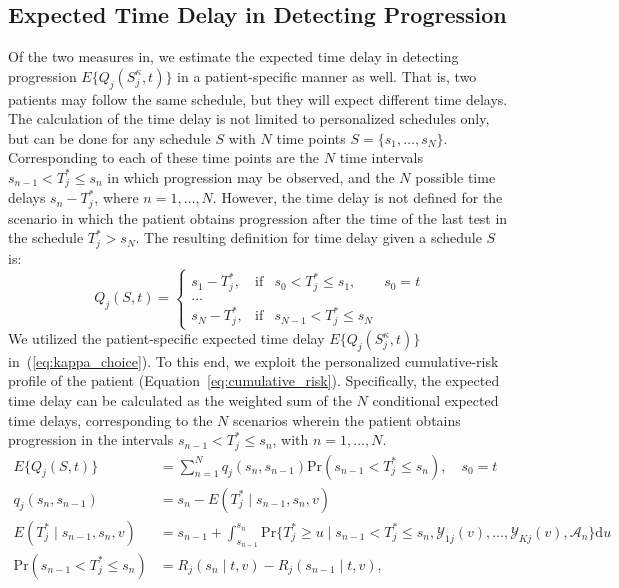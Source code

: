 \subsection{Expected Time Delay in Detecting Progression}
\label{subsec:exp_delay_estimation}
Of the two measures in, we estimate the expected time delay in detecting progression $E\{Q_j(S_j^{\kappa}, t)\}$ in a patient-specific manner as well. That is, two patients may follow the same schedule, but they will expect different time delays. The calculation of the time delay is not limited to personalized schedules only, but can be done for any schedule $S$ with $N$ time points $S=\{s_1,\ldots, s_N\}$. Corresponding to each of these time points are the $N$ time intervals $s_{n-1} < T^*_j \leq s_n$ in which progression may be observed, and the $N$ possible time delays $s_n - T^*_j$, where $n=1,\ldots,N$. However, the time delay is not defined for the scenario in which the patient obtains progression after the time of the last test in the schedule $T^*_j > s_N$. The resulting definition for time delay given a schedule $S$ is:
\begin{equation}
Q_j (S, t) = \left\{ \begin{array}{lcrr}
  s_1 - T^*_j, &\mbox{if}& s_0 < T^*_j \leq s_1, &s_0=t\\
  \ldots \\
  s_N - T^*_j, &\mbox{if}& s_{N-1} < T^*_j \leq s_N  
\end{array} \right.
\end{equation}
We utilized the patient-specific expected time delay $E\{Q_j(S_j^{\kappa}, t)\}$ in~(\ref{eq:kappa_choice}). To this end, we exploit the personalized cumulative-risk profile of the patient (Equation~\ref{eq:cumulative_risk}). Specifically, the expected time delay can be calculated as the weighted sum of the $N$ conditional expected time delays, corresponding to the $N$ scenarios wherein the patient obtains progression in the intervals $s_{n-1} < T^*_j \leq s_n$, with $n=1,\ldots,N$.
\begin{equation}
\label{eq:expected_delay}
\begin{split}
E\{Q_j(S, t)\} &= \sum_{n=1}^{N} q_j(s_n, s_{n-1}) \mbox{Pr}(s_{n-1} < T^*_j \leq s_n) , \quad s_0 = t\\
q_j(s_n, s_{n-1}) &= s_n - E(T^*_j \mid s_{n-1}, s_n, v)\\
E(T^*_j \mid s_{n-1}, s_n, v) &= s_{n-1} + \int_{s_{n-1}}^{s_n} \mbox{Pr}\Big\{T^*_j \geq u \mid s_{n-1} < T^*_j \leq s_n, \mathcal{Y}_{1j}(v), \ldots, \mathcal{Y}_{Kj}(v), \mathcal{A}_n\Big\} \mathrm{d}u\\
\mbox{Pr}(s_{n-1} < T^*_j \leq s_n) &= R_j(s_n \mid t, v) - R_j(s_{n-1} \mid t, v),
\end{split}
\end{equation}
